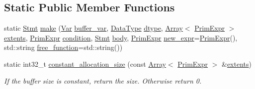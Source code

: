 \subsection*{Static Public Member Functions}
\begin{DoxyCompactItemize}
\item 
static \hyperlink{classtvm_1_1tir_1_1Stmt}{Stmt} \hyperlink{classtvm_1_1tir_1_1AllocateNode_a0e3c6c493843b0e96cdbeedb7992b695}{make} (\hyperlink{classtvm_1_1tir_1_1Var}{Var} \hyperlink{classtvm_1_1tir_1_1AllocateNode_acc0828bc8173ba2d46f90ddd2a329ae0}{buffer\+\_\+var}, \hyperlink{namespacetvm_a41918af1a1dc386388639a9d3ad06c5d}{Data\+Type} \hyperlink{classtvm_1_1tir_1_1AllocateNode_aba885cfd49a10c594320d0e84a9a4c90}{dtype}, \hyperlink{classtvm_1_1Array}{Array}$<$ \hyperlink{classtvm_1_1PrimExpr}{Prim\+Expr} $>$ \hyperlink{classtvm_1_1tir_1_1AllocateNode_a0f6d59cffc5fda07450e0fdab6b66bcb}{extents}, \hyperlink{classtvm_1_1PrimExpr}{Prim\+Expr} \hyperlink{classtvm_1_1tir_1_1AllocateNode_a6b855ad51d1fcb4e21e9afe657f77ba5}{condition}, \hyperlink{classtvm_1_1tir_1_1Stmt}{Stmt} \hyperlink{classtvm_1_1tir_1_1AllocateNode_a797e50c85f4bc016bcf3a3a22737980e}{body}, \hyperlink{classtvm_1_1PrimExpr}{Prim\+Expr} \hyperlink{classtvm_1_1tir_1_1AllocateNode_a52b31635e23aeb6e18e83aa3cc9f8d00}{new\+\_\+expr}=\hyperlink{classtvm_1_1PrimExpr}{Prim\+Expr}(), std\+::string \hyperlink{classtvm_1_1tir_1_1AllocateNode_ac2c84aa70f243d933c0480331910de52}{free\+\_\+function}=std\+::string())
\item 
static int32\+\_\+t \hyperlink{classtvm_1_1tir_1_1AllocateNode_ac30c52ef2a4d9f728026f4f7188094ce}{constant\+\_\+allocation\+\_\+size} (const \hyperlink{classtvm_1_1Array}{Array}$<$ \hyperlink{classtvm_1_1PrimExpr}{Prim\+Expr} $>$ \&\hyperlink{classtvm_1_1tir_1_1AllocateNode_a0f6d59cffc5fda07450e0fdab6b66bcb}{extents})
\begin{DoxyCompactList}\small\item\em If the buffer size is constant, return the size. Otherwise return 0. \end{DoxyCompactList}\end{DoxyCompactItemize}
